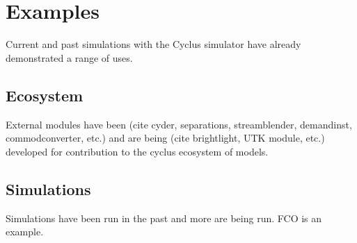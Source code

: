 \section{Examples}
%

%


Current and past simulations with the Cyclus simulator have already 
demonstrated a range of uses. 

\subsection{Ecosystem}


External modules have been (cite cyder, separations, streamblender, demandinst, 
commodconverter, etc.) and are being (cite brightlight, UTK module, etc.) 
developed for contribution to the cyclus ecosystem of models. 


\subsection{Simulations}


Simulations have been run in the past and more are being run. FCO is an 
example. 
